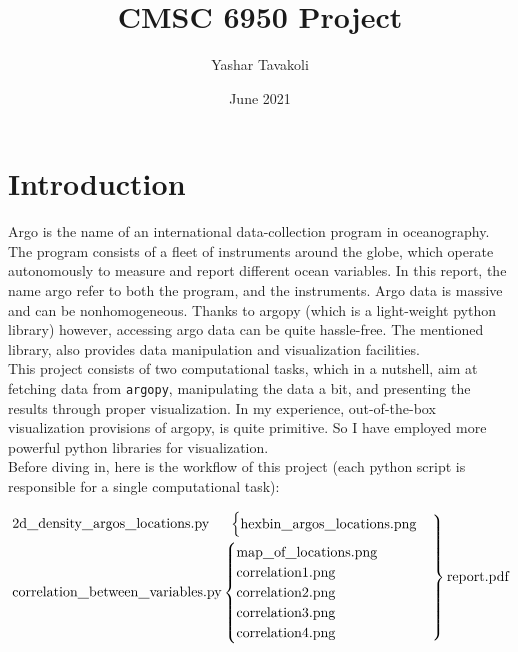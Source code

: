 \documentclass[12pt]{article}
\title{CMSC 6950 Project}
\date{June 2021}
\author{Yashar Tavakoli}
\begin{document}
\maketitle
\section{Introduction}

Argo is the name of 
an international data-collection program in oceanography. 
The program consists of a fleet of instruments around the globe, 
which operate
autonomously to measure and report different ocean variables. 
In this report, the name argo refer to both the program, and the
instruments.
Argo data is massive and can be nonhomogeneous. Thanks
to argopy (which is a light-weight
python library) however, accessing argo data can be quite hassle-free. The mentioned
library, also provides data manipulation and visualization
facilities. \\

This project consists of two computational tasks, which in a 
nutshell, aim at fetching data from \verb|argopy|, 
manipulating the data a bit, and presenting the results
through proper visualization. In my experience, out-of-the-box
visualization provisions of argopy, is quite primitive. So I have 
employed more powerful python libraries for visualization. \\

Before diving in, here is the workflow of this project 
(each python script is responsible for a single computational task):

\begin{equation*}
    \begin{rcases}
    \text{2d\underline{\hspace{8pt}}density\underline{\hspace{8pt}}argos\underline{\hspace{8pt}}locations.py}\hspace{14pt}\begin{cases}
      \text{hexbin\underline{\hspace{8pt}}argos\underline{\hspace{8pt}}locations.png}
    \end{cases}
    \\
    \text{correlation\underline{\hspace{8pt}}between\underline{\hspace{8pt}}variables.py}\begin{cases}
        \text{map\underline{\hspace{8pt}}of\underline{\hspace{8pt}}locations.png}\\
        \text{correlation1.png}\\
        \text{correlation2.png}\\
        \text{correlation3.png}\\
        \text{correlation4.png}
    \end{cases}
    \end{rcases}
    \text{report.pdf}
\end{equation*}
\end{document}
